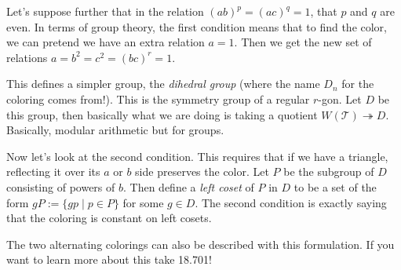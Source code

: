 \documentclass{article}
\theoremstyle{definition}
\theoremstyle{remark}
\begin{document}
Let's suppose further that in the relation $(ab)^p=(ac)^q=1$, that $p$ and $q$ are even. In terms of group theory, the first condition means that to find the color, we can pretend we have an extra relation $a=1$. Then we get the new set of relations $a=b^2=c^2=(bc)^r=1$.

This defines a simpler group, the \emph{dihedral group} (where the name $D_n$ for the coloring comes from!). This is the symmetry group of a regular $r$-gon. Let $D$ be this group, then basically what we are doing is taking a quotient $W(\mathcal T)\twoheadrightarrow D$. Basically, modular arithmetic but for groups.

Now let's look at the second condition. This requires that if we have a triangle, reflecting it over its $a$ or $b$ side preserves the color. Let $P$ be the subgroup of $D$ consisting of powers of $b$. Then define a \emph{left coset} of $P$ in $D$ to be a set of the form $gP:=\{gp\mid p\in P\}$ for some $g\in D$. The second condition is exactly saying that the coloring is constant on left cosets.

The two alternating colorings can also be described with this formulation. If you want to learn more about this take 18.701!
\end{document}
